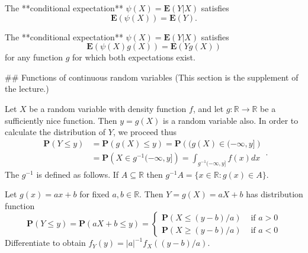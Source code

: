 \begin{theorem}
The **conditional expectation** $\psi(X) = \mathbf{E}(Y \vert X)$ satisfies 
\begin{equation*}
    \mathbf{E}(\psi(X)) = \mathbf{E}(Y).
\end{equation*}
\end{theorem}

\begin{theorem}
The **conditional expectation** $\psi(X) = \mathbf{E}(Y \vert X)$ satisfies 
\begin{equation*}
    \mathbf{E}\left( \psi(X) g(X) \right) = \mathbf{E}(Y g(X))
\end{equation*}
for any function $g$ for which both expectations exist.
\end{theorem}



## Functions of continuous random variables
(This section is the supplement of the lecture.)

Let $X$ be a random variable with density function $f$, and let $g : \mathbb{R} \to \mathbb{R}$ be a sufficiently nice 
function. Then $y = g(X)$ is a random variable also. In order to calculate the distribution of $Y$, we proceed thus
\begin{equation*}
    \begin{aligned} 
        \mathbf{P}(Y \leq y) &= \mathbf{P}\left(g(X) \leq y\right) = \mathbf{P}\left((g(X) \in(-\infty, y] \right) \\
        &=\mathbf{P}\left(X \in g^{-1}(-\infty, y]\right)=\int_{g^{-1}(-\infty, y]} f(x) d x\end{aligned}.
\end{equation*}
The $g^{-1}$ is defined as follows. If $A \subseteq \mathbb{R}$ then $g^{-1} A=\{x \in \mathbb{R}: g(x) \in A\}$.

\begin{example}
Let $g(x) = ax + b$ for fixed $a, b \in \mathbb{R}$. Then $Y = g (X) = aX + b$ has distribution function 
\begin{equation*}
    \mathbf{P}(Y \leq y) = \mathbf{P}(a X+b \leq y) = \left\{\begin{array}{ll}
    {\mathbf{P}(X \leq(y-b) / a)} & {\text { if } a>0} \\
    {\mathbf{P}(X \geq(y-b) / a)} & {\text { if } a<0}\end{array}\right.
\end{equation*}
Differentiate to obtain $f_{Y}(y)=|a|^{-1} f_{X}((y-b) / a)$.
\end{example}

